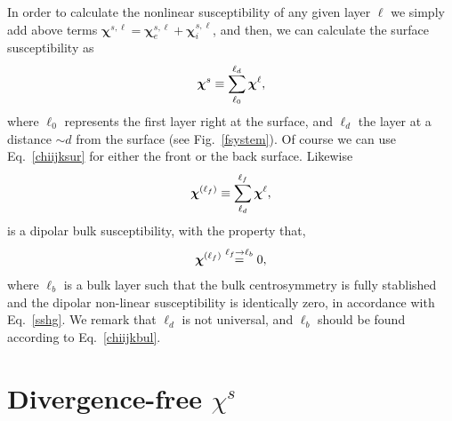 \documentclass[floatfix,prb,aps,superscriptaddress,11pt,preprint]{revtex4}
\begin{document}
In order to calculate
the nonlinear susceptibility of any given layer $\ell$ we simply add above terms
$\boldsymbol{\chi}^{s,\ell}=\boldsymbol{\chi}_e^{s,\ell}+\boldsymbol{\chi}_i^{s,\ell}$, 
and 
then,
we can calculate the surface
susceptibility as 
\begin{equation}\label{chiijksur}
\boldsymbol{\chi}^s\equiv \sum_{\ell_0}^{\ell_d}\boldsymbol{\chi}^{\ell},
\end{equation}
where $\ell_0$ represents the first  layer right at the surface, and $\ell_d$ the
layer at a distance $\sim d$ from the surface (see
Fig.~\ref{fsystem}). Of course we can use Eq.~\eqref{chiijksur} for
either the front or the back surface.
Likewise
\begin{equation}\label{chiijklf}
\boldsymbol{\chi}^{(\ell_f)}\equiv \sum_{\ell_d}^{\ell_f}\boldsymbol{\chi}^{\ell},
\end{equation}
is a dipolar bulk susceptibility, with the property that,
\begin{equation}\label{chiijkbul}
\boldsymbol{\chi}^{(\ell_f)}\stackrel{\ell_f \to \ell_b}{=} 0,
\end{equation}
where $\ell_b$ is a bulk layer such that the bulk centrosymmetry is
fully stablished and the dipolar non-linear susceptibility is
identically zero, in accordance with Eq.~\eqref{sshg}. We remark that 
$\ell_d$  is
not universal, and $\ell_b$ should be found according to Eq.~\eqref{chiijkbul}. 

\section{Divergence-free $\chi^s$}
\end{document}
